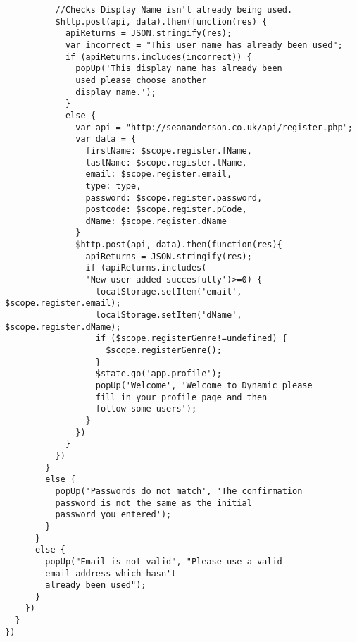 \begin{verbatim}
          //Checks Display Name isn't already being used.
          $http.post(api, data).then(function(res) {
            apiReturns = JSON.stringify(res);
            var incorrect = "This user name has already been used";
            if (apiReturns.includes(incorrect)) {
              popUp('This display name has already been 
              used please choose another 
              display name.');
            }
            else {
              var api = "http://seananderson.co.uk/api/register.php";
              var data = {
                firstName: $scope.register.fName,
                lastName: $scope.register.lName,
                email: $scope.register.email,
                type: type,
                password: $scope.register.password,
                postcode: $scope.register.pCode,
                dName: $scope.register.dName
              }
              $http.post(api, data).then(function(res){
                apiReturns = JSON.stringify(res);
                if (apiReturns.includes(
                'New user added succesfully')>=0) {
                  localStorage.setItem('email', $scope.register.email);
                  localStorage.setItem('dName', $scope.register.dName);
                  if ($scope.registerGenre!=undefined) {
                    $scope.registerGenre();
                  }
                  $state.go('app.profile');
                  popUp('Welcome', 'Welcome to Dynamic please 
                  fill in your profile page and then 
                  follow some users');
                }
              })
            }
          })
        }
        else {
          popUp('Passwords do not match', 'The confirmation 
          password is not the same as the initial 
          password you entered');
        }
      }
      else {
        popUp("Email is not valid", "Please use a valid 
        email address which hasn't 
        already been used");
      }
    })
  }
})
\end{verbatim}

